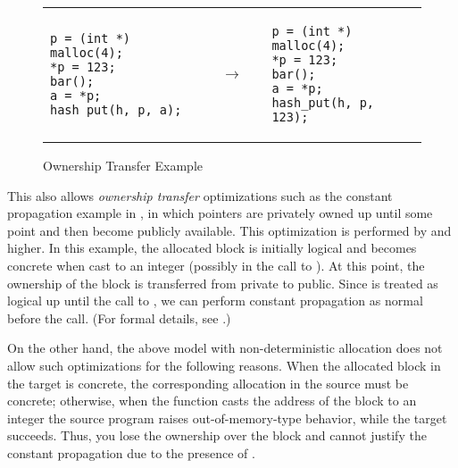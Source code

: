 \begin{figure}[t]
\small
\center
\begin{tabular}{lll}
\begin{minipage}{0.3\textwidth}
\begin{verbatim}
p = (int *) malloc(4);
*p = 123;
bar();
a = *p;
hash_put(h, p, a);
\end{verbatim}
\end{minipage}
&
$\quad\rightarrow\quad$
&
\begin{minipage}{0.3\textwidth}
\begin{verbatim}
p = (int *) malloc(4);
*p = 123;
bar();
a = *p;
hash_put(h, p, 123);
\end{verbatim}
\end{minipage}
\end{tabular}
\caption{Ownership Transfer Example}\label{fig:intptrcast:formal-semantics:ownership}
\end{figure}

This also allows \emph{ownership transfer} optimizations such as the
constant propagation example in , in which
pointers are privately owned up until some point and then become
publicly available.  
This optimization is performed by  and higher.
In this example,
the allocated block is initially logical and becomes concrete when cast to an
integer (possibly in the call to ). At this point, the ownership of the block is transferred from
private to public. Since  is treated as logical up until the
call to , we can perform constant propagation as
normal before the call. (For formal details, see .)

On the other hand, the above model with
non-deterministic allocation does not allow such optimizations for the following reasons.
When the allocated block in the target is concrete, the
  corresponding allocation in the source must be concrete; otherwise,
  when the function  casts the address of the block to
  an integer the source program raises out-of-memory-type behavior, while the target succeeds.
Thus, you lose the ownership over the block and cannot justify the constant propagation due to the presence of .



